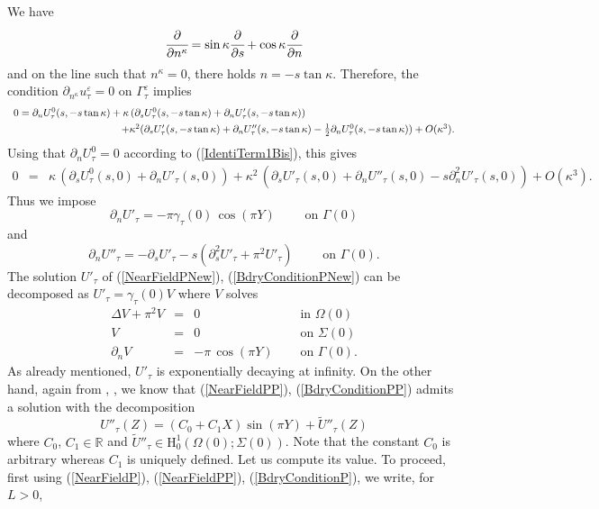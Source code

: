 \documentclass[11pt,a4paper]{article}
\newcommand{\eps}{\varepsilon}
\newcommand{\Om}{\Omega}
\newcommand{\mrm}[1]{\mathrm{#1}}
\newcommand{\R}{\mathbb{R}}
\newcommand{\mH}{\mrm{H}}
\begin{document}
We have
\[
\cfrac{\partial}{\partial n^\kappa}=\sin\kappa\cfrac{\partial}{\partial s}+\cos\kappa\cfrac{\partial}{\partial n}
\]
and on the line such that $n^\kappa=0$, there holds $n=-s\tan\kappa $. Therefore, the condition 
$\partial_{n^\kappa}u^\eps_\tau=0$ on $\Gamma^\eps_\tau$ implies
\[
\begin{array}{l}
0=\partial_nU^0_\tau(s,-s\tan\kappa)+\kappa\,(\partial_sU^0_\tau(s,-s\tan\kappa)+\partial_nU'_\tau(s,-s\tan\kappa))\\[4pt]
\hspace{3.7cm}+\kappa^2(\partial_sU'_\tau(s,-s\tan\kappa)+\partial_nU''_\tau(s,-s\tan\kappa)-\frac{1}{2}\partial_nU^0_\tau(s,-s\tan\kappa))+O(\kappa^3).
\end{array}
\]
Using that $\partial_nU^0_\tau=0$ according to (\ref{IdentiTerm1Bis}), this gives
\[
\begin{array}{rcl}
0&=&\kappa\,(\partial_sU^0_\tau(s,0)+\partial_nU'_\tau(s,0))+\kappa^2\,(\partial_sU'_\tau(s,0)+\partial_nU''_\tau(s,0)- s\partial^2_nU'_\tau(s,0))+O(\kappa^3).
\end{array}
\]
Thus we impose 
\begin{equation}\label{BdryConditionPNew}
\partial_nU'_\tau=-\pi\gamma_\tau(0)\,\cos(\pi Y)\qquad\mbox{ on }\Gamma(0)
\end{equation}
and
\begin{equation}\label{BdryConditionPP}
\partial_nU''_\tau=-\partial_sU'_\tau- s(\partial^2_sU'_\tau+\pi^2U'_\tau)\qquad\mbox{ on }\Gamma(0).
\end{equation}
The solution $U'_\tau$ of (\ref{NearFieldPNew}), (\ref{BdryConditionPNew}) can be decomposed as $U'_\tau=\gamma_\tau(0) V$ where $V$ solves
\[
\begin{array}{|rcll}
\Delta V+\pi^2V&=&0&\quad\mbox{ in }\Om(0)\\[3pt]
V&=&0&\quad\mbox{ on }\Sigma(0)\\[3pt]
\partial_nV&=&-\pi\,\cos(\pi Y)&\quad\mbox{ on }\Gamma(0).
\end{array}
\] 
As already mentioned, $U'_\tau$ is exponentially decaying at infinity. On the other hand, again from \cite{Kond67}, \cite[Chap.\,5]{NaPl94}, we know that (\ref{NearFieldPP}), (\ref{BdryConditionPP}) admits a solution with the decomposition 
\begin{equation}\label{ExpanTermAffineNew}
U''_{\tau}(Z)=(C_0+C_1X)\sin(\pi Y)+\tilde{U}''_{\tau}(Z)
\end{equation}
where $C_0$, $C_1\in\R$ and $\tilde{U}''_{\tau}\in\mH^1_0(\Om(0);\Sigma(0))$. Note that the constant $C_0$ is arbitrary whereas $C_1$ is uniquely defined. Let us compute its value. To proceed, first using (\ref{NearFieldP}), (\ref{NearFieldPP}), (\ref{BdryConditionP}), we write, for $L>0$,
\end{document}
